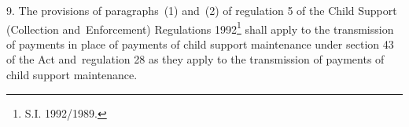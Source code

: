 \documentclass[12pt,a4paper]{article}
\begin{document}
%
%
%
%
%
%
%
%
%
%
%
%
%
%
%

9.  The provisions of paragraphs~(1) and~(2) of regulation 5 of the Child Support (Collection and~Enforcement) Regulations 1992\footnote{\frenchspacing  S.I. 1992/1989.} shall apply to the transmission of payments in place of payments of child support maintenance under section 43 of the Act and~regulation 28 as they apply to the transmission of payments of child support maintenance.
\end{document}
